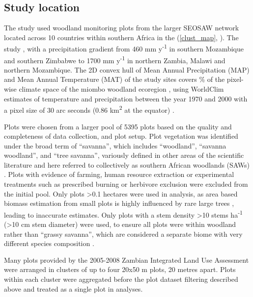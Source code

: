 \documentclass[11pt,a4paper]{article}
\newcommand{\textapprox}{\raisebox{0.5ex}{\texttildelow}}  %
\begin{document}
\subsection*{Study location}

The study used \nplots{} woodland monitoring plots from the larger SEOSAW network \citep{seosaw_web} located across 10 countries within southern Africa in the  (\autoref{clust_map}, \citealt{White1983}). The study , with a precipitation gradient from \textapprox{}460 mm y\textsuperscript{-1} in southern Mozambique and southern Zimbabwe to \textapprox{}1700 mm y\textsuperscript{-1} in northern Zambia, Malawi and northern Mozambique. The 2D convex hull of Mean Annual Precipitation (MAP) and Mean Annual Temperature (MAT) of the study sites covers \hullcover{}\% of the pixel-wise climate space of the miombo woodland ecoregion  \citep{White1983}, using WorldClim estimates of temperature and precipitation between the year 1970 and 2000 with a pixel size of 30 arc seconds (0.86 km\textsuperscript{2} at the equator) \citep{Fick2017}. 

Plots were chosen from a larger pool of 5395 plots based on the quality and completeness of data collection, and plot setup. Plot vegetation was identified under the broad term of ``savanna'', which includes ``woodland'', ``savanna woodland'', and ``tree savanna'', variously defined in other areas of the scientific literature and here referred to collectively as southern African woodlands (SAWs) \citep{Ratnam2011, Hill2010}. Plots with evidence of farming, human resource extraction or experimental treatments such as prescribed burning or herbivore exclusion were excluded from the initial pool. Only plots >0.1 hectares were used in analysis, as area based biomass estimation from small plots is highly influenced by rare large trees \citep{Stegen2011}, leading to inaccurate estimates. Only plots with a stem density >10 stems ha\textsuperscript{-1} (>10 cm stem diameter) were used, to ensure all plots were within woodland rather than ``grassy savanna'', which are considered a separate biome with very different species composition \citep{Parr2014}. 

Many plots provided by the 2005-2008 Zambian Integrated Land Use Assessment \citep{Mukosha2009} were arranged in clusters of up to four 20x50 m plots, 20 metres apart. Plots within each cluster were aggregated before the plot dataset filtering described above and treated as a single plot in analyses.
\end{document}

